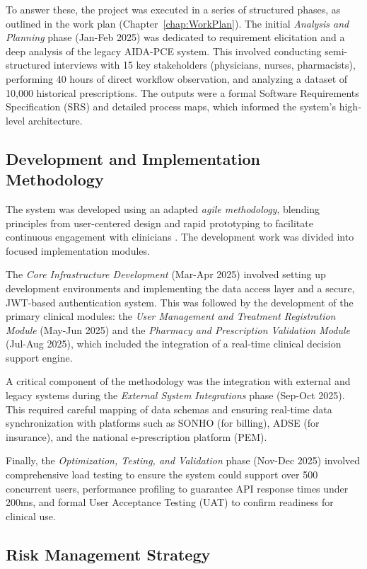 To answer these, the project was executed in a series of structured phases, as outlined in the work plan (Chapter~\ref{chap:WorkPlan}). The initial \textit{Analysis and Planning} phase (Jan-Feb 2025) was dedicated to requirement elicitation and a deep analysis of the legacy AIDA-PCE system. This involved conducting semi-structured interviews with 15 key stakeholders (physicians, nurses, pharmacists), performing 40 hours of direct workflow observation, and analyzing a dataset of 10,000 historical prescriptions. The outputs were a formal Software Requirements Specification (SRS) and detailed process maps, which informed the system's high-level architecture.

\subsection{Development and Implementation Methodology}

The system was developed using an adapted \textit{agile methodology}, blending principles from user-centered design and rapid prototyping to facilitate continuous engagement with clinicians \cite{fowler2018}. The development work was divided into focused implementation modules.

The \textit{Core Infrastructure Development} (Mar-Apr 2025) involved setting up development environments and implementing the data access layer and a secure, JWT-based authentication system. This was followed by the development of the primary clinical modules: the \textit{User Management and Treatment Registration Module} (May-Jun 2025) and the \textit{Pharmacy and Prescription Validation Module} (Jul-Aug 2025), which included the integration of a real-time clinical decision support engine.

A critical component of the methodology was the integration with external and legacy systems during the \textit{External System Integrations} phase (Sep-Oct 2025). This required careful mapping of data schemas and ensuring real-time data synchronization with platforms such as SONHO (for billing), ADSE (for insurance), and the national e-prescription platform (PEM).

Finally, the \textit{Optimization, Testing, and Validation} phase (Nov-Dec 2025) involved comprehensive load testing to ensure the system could support over 500 concurrent users, performance profiling to guarantee API response times under 200ms, and formal User Acceptance Testing (UAT) to confirm readiness for clinical use.

\subsection{Risk Management Strategy}

